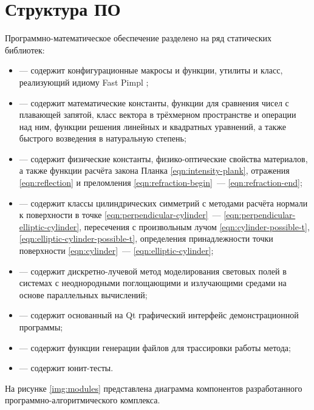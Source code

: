 

\section{Структура ПО}

Программно-математическое обеспечение разделено на ряд статических библиотек:
\begin{itemize}
	\item {} — содержит конфигурационные макросы и функции, утилиты и класс, реализующий идиому Fast Pimpl \cite{fast-pimpl};
	\item {} — содержит математические константы, функции для сравнения чисел с плавающей запятой, класс вектора в трёхмерном пространстве и операции над ним, функции решения линейных и квадратных уравнений, а также быстрого возведения в натуральную степень;
	\item {} — содержит физические константы, физико-оптические свойства материалов, а также функции расчёта закона Планка \eqref{eqn:intensity-plank}, отражения \eqref{eqn:reflection} и преломления \eqref{eqn:refraction-begin}~— \eqref{eqn:refraction-end};
	\item {} — содержит классы цилиндрических симметрий с методами расчёта нормали к поверхности в точке \eqref{eqn:perpendicular-cylinder}~— \eqref{eqn:perpendicular-elliptic-cylinder}, пересечения с произвольным лучом \eqref{eqn:cylinder-possible-t}, \eqref{eqn:elliptic-cylinder-possible-t}, определения принадлежности точки поверхности \eqref{eqn:cylinder}~— \eqref{eqn:elliptic-cylinder};
	\item {} — содержит дискретно-лучевой метод моделирования световых полей в системах с неоднородными поглощающими и излучающими средами на основе параллельных вычислений;
	\item {} — содержит основанный на Qt графический интерфейс демонстрационной программы;
	\item {} — содержит функции генерации  файлов \cite{ggb} для трассировки работы метода;
	\item {} — содержит юнит-тесты.
\end{itemize}

На рисунке \ref{img:modules} представлена диаграмма компонентов разработанного программно-алгоритмического комплекса.

